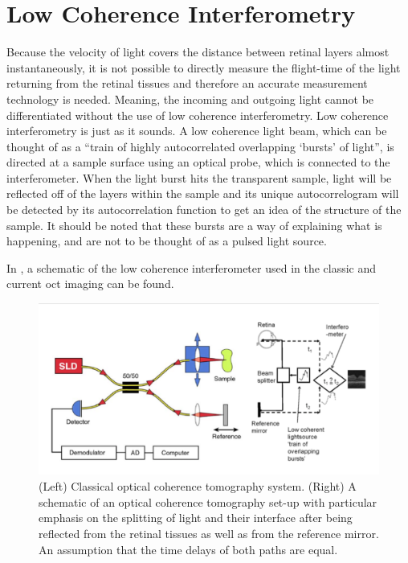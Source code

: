 \section{Low Coherence Interferometry}
Because the velocity of light covers the distance between retinal layers 
almost instantaneously, it is not possible to directly measure the flight-time 
of the light returning from the retinal tissues and therefore an accurate 
measurement technology is needed. \cite{mbib_5} Meaning, the incoming 
and outgoing light cannot be differentiated without the use of low
coherence interferometry. Low coherence interferometry is just as it
sounds.  A low coherence light beam, which can be thought of as
a \enquote{train of highly autocorrelated overlapping \enquote{bursts} of light},
is directed at a sample surface using an optical probe, which is connected
to the interferometer.\cite{mbib_4}  When the light burst hits the
transparent sample, light will be reflected off of the layers within
the sample and its unique autocorrelogram will be detected by its
autocorrelation function to get an idea of the structure of the sample.
\cite{mbib_4,mbib_3,mbib_6} It should be noted that these
bursts are a way of explaining what is happening, and are not
to be thought of as a pulsed light source.

In , a schematic of the low coherence interferometer used
in the classic and current \Gls{oct} imaging can be found.

\begin{figure}[H]
\centering
\includegraphics[width=14cm]{figures/morgan_1}
\caption{(Left) Classical optical coherence tomography system. 
(Right) A schematic of an optical coherence tomography set-up with particular emphasis on the splitting of light and their interface after being reflected from the retinal tissues as well as from the reference mirror.  An assumption that the time delays of both paths are equal. \cite{mbib_6,mbib_4} }
\label{fig:m_1}
\end{figure}

